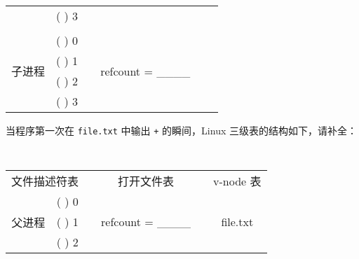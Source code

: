 \begin{problems}
\begin{table}[H]
\begin{tabular}{cccccc}
                \multicolumn{1}{|c|}{} & \multicolumn{1}{c|}{(     ) 3} & \multicolumn{1}{c|}{} & \multicolumn{1}{c|}{} & \multicolumn{1}{c|}{} & \multicolumn{1}{c|}{} \\ \cline{1-2} \cline{4-4}
                &  &  &  & \multicolumn{1}{c|}{} & \multicolumn{1}{c|}{} \\ \cline{1-2} \cline{4-4}
                \multicolumn{1}{|c|}{\multirow{4}{*}{子进程}} & \multicolumn{1}{c|}{(     ) 0} & \multicolumn{1}{c|}{} & \multicolumn{1}{c|}{\multirow{4}{*}{refcount = \_\_\_\_}} & \multicolumn{1}{c|}{} & \multicolumn{1}{c|}{} \\ \cline{2-2}
                \multicolumn{1}{|c|}{} & \multicolumn{1}{c|}{(     ) 1} & \multicolumn{1}{c|}{} & \multicolumn{1}{c|}{} & \multicolumn{1}{c|}{} & \multicolumn{1}{c|}{} \\ \cline{2-2}
                \multicolumn{1}{|c|}{} & \multicolumn{1}{c|}{(     ) 2} & \multicolumn{1}{c|}{} & \multicolumn{1}{c|}{} & \multicolumn{1}{c|}{} & \multicolumn{1}{c|}{} \\ \cline{2-2}
                \multicolumn{1}{|c|}{} & \multicolumn{1}{c|}{(     ) 3} & \multicolumn{1}{c|}{} & \multicolumn{1}{c|}{} & \multicolumn{1}{c|}{} & \multicolumn{1}{c|}{} \\ \cline{1-2} \cline{4-4} \cline{6-6} 
            \end{tabular}
        \end{table}
        \subqn 当程序第一次在 \verb|file.txt| 中输出 \verb|+| 的瞬间，Linux 三级表的结构如下，请补全：
        \begin{table}[H]
            \tt
            \centering
            \begin{tabular}{cccccc}
                \multicolumn{2}{c}{文件描述符表} & {\qquad} & 打开文件表 & {\qquad} & v-node 表 \\ \cline{1-2} \cline{4-4} \cline{6-6} 
                \multicolumn{1}{|c|}{\multirow{4}{*}{父进程}} & \multicolumn{1}{c|}{(     ) 0} & \multicolumn{1}{c|}{} & \multicolumn{1}{c|}{\multirow{4}{*}{refcount = \_\_\_\_}} & \multicolumn{1}{c|}{} & \multicolumn{1}{c|}{\multirow{9}{*}{file.txt}} \\ \cline{2-2}
                \multicolumn{1}{|c|}{} & \multicolumn{1}{c|}{(     ) 1} & \multicolumn{1}{c|}{} & \multicolumn{1}{c|}{} & \multicolumn{1}{c|}{} & \multicolumn{1}{c|}{} \\ \cline{2-2}
                \multicolumn{1}{|c|}{} & \multicolumn{1}{c|}{(     ) 2} & \multicolumn{1}{c|}{} & \multicolumn{1}{c|}{} & \multicolumn{1}{c|}{} & \multicolumn{1}{c|}{} \\ \cline{2-2}

\end{tabular}
\end{table}
\end{problems}
